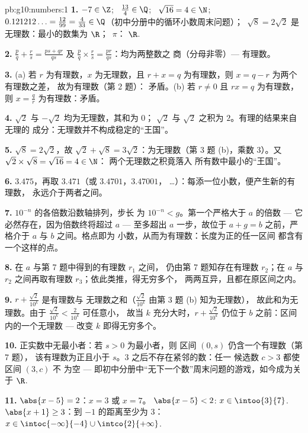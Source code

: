 \begin{solution}{pb:g10:numbers:1}
\textbf{1.} $-7 \in \Z$; \ $\frac{13}{4} \in \Q$; \
$\sqrt{16} = 4 \in \N$; \ $0.121212\ldots = \frac{12}{99} =
\frac{4}{33} \in \Q$（初中分册中的循环小数周末问题）；\
$\sqrt8 = 2\sqrt2$ 是无理数：最小的数集为 $\R$；\ $\pi$：
$\R$.

\textbf{2.} $\frac pq + \frac rs = \frac{ps + qr}{qs}$ 及
$\frac pq \times \frac rs = \frac{pr}{qs}$：均为两整数之
商（分母非零）--- 有理数。

\textbf{3.} (a) 若 $r$ 为有理数，$x$ 为无理数，且
$r + x = q$ 为有理数，则 $x = q - r$ 为两个有理数之差，
故为有理数（第 2 题）：
矛盾。(b) 若 $r \neq 0$ 且 $r x = q$ 为有理数，则
$x = \frac qr$ 为有理数：矛盾。

\textbf{4.} $\sqrt2$ 与 $-\sqrt2$ 均为无理数，其和为 $0$；
$\sqrt2$ 与 $\sqrt2$ 之积为 $2$。有理的结果来自无理的
成分：无理数并不构成稳定的“王国”。

\textbf{5.} $\sqrt8 = 2\sqrt2$，故
$\sqrt2 + \sqrt8 = 3\sqrt2$：为无理数（第 3 题 (b)，乘数
$3$）。又 $\sqrt2 \times \sqrt8 = \sqrt{16} = 4 \in \N$：
两个无理数之积竟落入
所有数中最小的“王国”。

\textbf{6.} $3.475$，再取 $3.471$（或 $3.4701$，$3.47001$，
\dots）：每添一位小数，便产生新的有理数，
永远介于两者之间。

\textbf{7.} $10^{-n}$ 的各倍数沿数轴排列，步长
为 $10^{-n} < g$。第一个严格大于
$a$ 的倍数 --- 它必然存在，因为倍数终将超过
$a$ --- 至多超出 $a$ 一步，故位于
$a + g = b$ 之前，严格介于 $a$ 与 $b$ 之间。格点即为
小数，从而为有理数：长度为正的任一区间
都含有一个这样的点。

\textbf{8.} 在 $a$ 与第 7 题中得到的有理数 $r_1$ 之间，
仍由第 7 题知存在有理数 $r_2$；在
$a$ 与 $r_2$ 之间再取有理数 $r_3$；依此类推，得无穷多个，
两两互异，且都在原区间之内。

\textbf{9.} $r + \frac{\sqrt2}{10^k}$ 是有理数与
无理数之和（$\frac{\sqrt2}{10^k}$ 由第 3 题 (b) 知为无理数），
故此和为无理数。由于
$\frac{\sqrt2}{10^k} < \frac{2}{10^k}$ 可任意小，
故当 $k$ 充分大时，$r + \frac{\sqrt2}{10^k}$ 仍位于
$b$ 之前：区间内的一个无理数 --- 改变
$k$ 即得无穷多个。

\textbf{10.} 正实数中无最小者：若 $s > 0$ 为最小者，则
区间 $(0, s)$ 仍含一个有理数（第 7 题），
该有理数为正且小于 $s$。$3$ 之后不存在紧邻的数：任一
候选数 $c > 3$ 都使区间 $(3, c)$ 不
为空 --- 即初中分册中“无下一个数”周末问题的游戏，如今成为关于
$\R$.

\textbf{11.} $\abs{x - 5} = 2$：$x = 3$ 或 $x = 7$。
$\abs{x - 5} < 2$: $x \in \intoo{3}{7}$.
$\abs{x + 1} \geq 3$：到 $-1$ 的距离至少为 $3$：
$x \in \intoc{-\infty}{-4} \cup \intco{2}{+\infty}$.


\end{solution}
